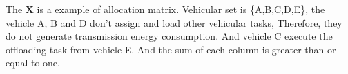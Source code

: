 \documentclass[conference]{IEEEtran}
\begin{document}
The $\mathbf{X}$ is a example of allocation matrix. Vehicular set is \{A,B,C,D,E\}, the vehicle A, B and D don't assign and load other vehicular tasks, Therefore, they do not generate transmission energy consumption. And vehicle C execute the offloading task from vehicle E. And the sum of each column is greater than or equal to one. 


\printbibliography
\end{document}

